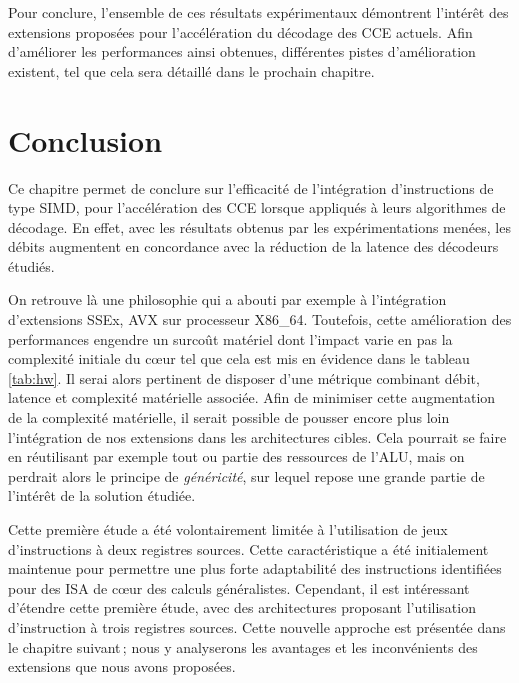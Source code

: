 \documentclass[../main.tex]{subfiles}
\begin{document}
Pour conclure, l'ensemble de ces résultats expérimentaux démontrent l'intérêt des extensions proposées pour l'accélération du décodage des CCE actuels. Afin d'améliorer les performances ainsi obtenues, différentes pistes d'amélioration existent, tel que cela sera détaillé dans le prochain chapitre.



%
%
%
%
\section{Conclusion}
%
%
%
%
Ce chapitre permet de conclure sur l'efficacité de l'intégration d'instructions de type SIMD, pour l'accélération des CCE lorsque appliqués à leurs algorithmes de décodage. 
En effet, avec les résultats obtenus par les expérimentations menées, les débits augmentent en concordance avec la réduction de la latence des décodeurs étudiés.

On retrouve là une philosophie qui a abouti par exemple à l'intégration d'extensions SSEx, AVX sur processeur X86\_64. 
Toutefois, cette amélioration des performances engendre un surcoût matériel dont l'impact varie en pas la complexité initiale du cœur tel que cela est mis en évidence dans le tableau \ref{tab:hw}. Il serai 
alors pertinent de disposer d'une métrique combinant débit, latence et complexité matérielle associée. 
Afin de minimiser cette augmentation de la complexité matérielle, il serait possible de pousser encore plus loin l'intégration de nos extensions dans les architectures cibles. 
Cela pourrait se faire en réutilisant par exemple tout ou partie des ressources de l'ALU, mais on perdrait alors le principe de \textit{généricité}, sur lequel repose une grande partie de l'intérêt de la solution étudiée.

Cette première étude a été volontairement limitée à l'utilisation de jeux d'instructions à deux registres sources. 
Cette caractéristique a été initialement maintenue pour permettre une plus forte adaptabilité des instructions identifiées pour des ISA de cœur des calculs généralistes. 
Cependant, il est intéressant d'étendre cette première étude, avec des architectures proposant l'utilisation d'instruction à trois registres sources. 
Cette nouvelle approche est présentée dans le chapitre suivant ; nous y analyserons les avantages et les inconvénients des extensions que nous avons proposées.
\end{document}
